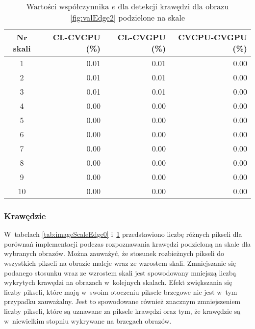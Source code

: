 \begin{center}
\begin{table}
\centering
\caption{Wartości współczynnika $ e $ dla detekcji krawędzi dla obrazu \ref{fig:valEdge2} podzielone na skale}
\label{tab:imageScaleEdge2}
\begin{tabular}{|c|r|r|r|}
 \hline
Nr skali & CL-CVCPU (\%) & CL-CVGPU (\%) & CVCPU-CVGPU (\%) \\ \hline
1        & 0.01     & 0.01     & 0.00        \\ \hline
2        & 0.01     & 0.01     & 0.00        \\ \hline
3        & 0.01     & 0.01     & 0.00        \\ \hline
4        & 0.00     & 0.00     & 0.00        \\ \hline
5        & 0.00     & 0.00     & 0.00        \\ \hline
6        & 0.00     & 0.00     & 0.00        \\ \hline
7        & 0.00     & 0.00     & 0.00        \\ \hline
8        & 0.00     & 0.00     & 0.00        \\ \hline
9        & 0.00     & 0.00     & 0.00        \\ \hline
10       & 0.00     & 0.00     & 0.00        \\ \hline
\end{tabular}
\end{table}
\end{center}

\subsubsection{Krawędzie}
\label{subsubsec:krawedzieTabele}

W~tabelach \ref{tab:imageScaleEdge0} i~\ref{tab:imageScaleEdge2} przedstawiono liczbę różnych pikseli dla porównań implementacji podczas rozpoznawania krawędzi podzieloną na skale dla wybranych obrazów. Można zauważyć, że stosunek rozbieżnych pikseli do wszystkich pikseli na obrazie maleje wraz ze wzrostem skali. Zmniejszanie się podanego stosunku wraz ze wzrostem skali jest spowodowany mniejszą liczbą wykrytych krawędzi na obrazach w~kolejnych skalach. Efekt zwiększania się liczby pikseli, które mają w~swoim otoczeniu piksele brzegowe nie jest w~tym przypadku zauważalny. Jest to spowodowane również znacznym zmniejszeniem liczby pikseli, które są uznawane za piksele krawędzi oraz tym, że krawędzie są w~niewielkim stopniu wykrywane na brzegach obrazów.


